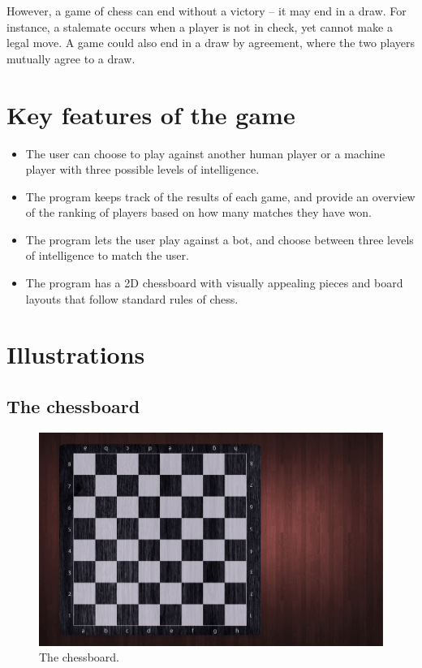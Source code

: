 \documentclass[12pt, a4paper]{article}
\begin{document}
However, a game of chess can end without a victory – it may end in a draw. For instance, a stalemate occurs when a player is not in check, yet cannot make a legal move. A game could also end in a draw by agreement, where the two players mutually agree to a draw.

\section{Key features of the game}
\begin{itemize}
\item The user can choose to play against another human player or a machine player with three possible levels of intelligence.
\item The program keeps track of the results of each game, and provide an overview of the ranking of players based on how many matches they have won.
\item The program lets the user play against a bot, and choose between three levels of intelligence to match the user.
\item The program has a 2D chessboard with visually appealing pieces and board layouts that follow standard rules of chess. 
\end{itemize}

\newpage
\vfill
\section{Illustrations}
\subsection{The chessboard}

\begin{figure}[h!]
\centering
\includegraphics[width=0.9\linewidth]{figures/board.jpg}
\caption{The chessboard.}
\end{figure}
\end{document}
